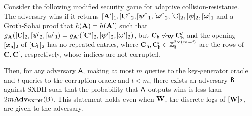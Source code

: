  \begin{lemma} \label{lemma:g-crp-sxdh} Consider the following modified security game for adaptive collision-resistance. The adversary wins if it returns $[\mathbf{{A}}']_1,[\mathbf{{C}}']_2,[{\boldsymbol{\psi}}']_1,[{\boldsymbol{\omega}}']_2,[\mathbf{{C}}]_2,[{\boldsymbol{\psi}}]_2,[{\boldsymbol{\omega}}]_1$ and a Groth-Sahai proof that  $h(\mathbf{{A}})=h(\mathbf{{A}}')$ such that $g_{\mathbf{{A}}}([\mathbf{{C}}]_2,[{\boldsymbol{\psi}}]_2,[{\boldsymbol{\omega}}]_1) = g_{\mathbf{{A}}'}([\mathbf{{C}}']_2,\allowbreak[{\boldsymbol{\psi}}']_2,[{\boldsymbol{\omega}}']_2)$, but  $\mathbf{{C}}_\mathsf{h}\not\sim_{\mathbf{{W}}}\mathbf{{C}}'_\mathsf{h}$ and the opening $[{\boldsymbol{x}}_\mathsf{h}]_2$ of $[\mathbf{{C}}_\mathsf{h}]_2$ has no repeated entries, where $\mathbf{{C}}_\mathsf{h},\mathbf{{C}}'_\mathsf{h}\in\mathbb{Z}_q^{2\times(m-t)}$ are the rows of $\mathbf{{C}}, \mathbf{{C}}'$, respectively, whose indices are not corrupted.

Then, for any adversary $\mathsf{A}$, making at most $m$  queries to the key-generator oracle and $t$ queries to the corruption oracle and $t<m$, there exists an adversary $\mathsf{B}$ against SXDH such that the probability that $\mathsf{A}$ outputs wins is less than $2m \mathbf{Adv}_{\mathrm{SXDH}}(\mathsf{B})$. This statement holds even when $\mathbf{{W}}$, the discrete logs of $[\mathbf{{W}}]_2$, are given to the adversary.
\end{lemma}
